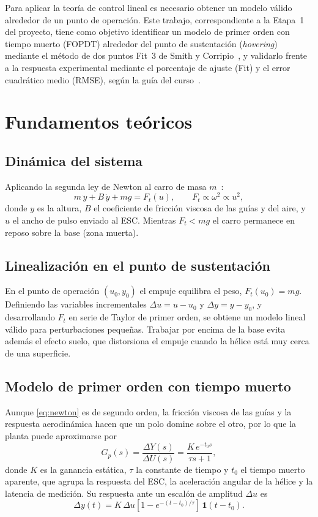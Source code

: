\documentclass[conference,10pt]{IEEEtran}
\begin{document}
Para aplicar la teoría de control lineal es necesario obtener un modelo válido alrededor de un punto de operación. Este trabajo, correspondiente a la Etapa~1 del proyecto, tiene como objetivo identificar un modelo de primer orden con tiempo muerto (FOPDT) alrededor del punto de sustentación (\textit{hovering}) mediante el método de dos puntos Fit~3 de Smith y Corripio~\cite{smith}, y validarlo frente a la respuesta experimental mediante el porcentaje de ajuste (Fit) y el error cuadrático medio (RMSE), según la guía del curso~\cite{guia}.

\section{Fundamentos teóricos}

\subsection{Dinámica del sistema}
Aplicando la segunda ley de Newton al carro de masa $m$~\cite{ogata}:
\begin{equation}
m\,\ddot y + B\,\dot y + m g = F_t(u), \qquad F_t \propto \omega^2 \propto u^2 ,
\label{eq:newton}
\end{equation}
donde $y$ es la altura, $B$ el coeficiente de fricción viscosa de las guías y del aire, y $u$ el ancho de pulso enviado al ESC. Mientras $F_t < mg$ el carro permanece en reposo sobre la base (zona muerta).

\subsection{Linealización en el punto de sustentación}
En el punto de operación $(u_0, y_0)$ el empuje equilibra el peso, $F_t(u_0)=mg$. Definiendo las variables incrementales $\Delta u=u-u_0$ y $\Delta y = y-y_0$, y desarrollando $F_t$ en serie de Taylor de primer orden, se obtiene un modelo lineal válido para perturbaciones pequeñas. Trabajar por encima de la base evita además el efecto suelo, que distorsiona el empuje cuando la hélice está muy cerca de una superficie.

\subsection{Modelo de primer orden con tiempo muerto}
Aunque \eqref{eq:newton} es de segundo orden, la fricción viscosa de las guías y la respuesta aerodinámica hacen que un polo domine sobre el otro, por lo que la planta puede aproximarse por
\begin{equation}
G_p(s)=\frac{\Delta Y(s)}{\Delta U(s)} = \frac{K\,e^{-t_0 s}}{\tau s + 1},
\label{eq:fopdt}
\end{equation}
donde $K$ es la ganancia estática, $\tau$ la constante de tiempo y $t_0$ el tiempo muerto aparente, que agrupa la respuesta del ESC, la aceleración angular de la hélice y la latencia de medición. Su respuesta ante un escalón de amplitud $\Delta u$ es
\begin{equation}
\Delta y(t) = K\,\Delta u \left[1-e^{-(t-t_0)/\tau}\right]\,\mathbf{1}(t-t_0).
\label{eq:respuesta}
\end{equation}
\end{document}
